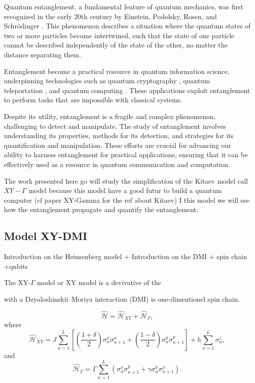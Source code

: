 Quantum entanglement, a fundamental feature of quantum mechanics, 
was first recognized in the early 20th century by Einstein, 
Podolsky, Rosen, and Schrödinger \cite{horodecki_quantum_2009}. This phenomenon describes 
a situation where the quantum states of two or more particles 
become intertwined, such that the state of one particle cannot 
be described independently of the state of the other, 
no matter the distance separating them. 



Entanglement become a practical resource 
in quantum information science, 
underpinning technologies such as quantum cryptography \cite{pirandola_advances_2020}, 
quantum teleportation \cite{bennett_teleporting_1993}, and quantum computing \cite{whitfield_quantum_2022}. 
These applications exploit entanglement 
to perform tasks that are impossible 
with classical systems.

Despite its utility, entanglement is a fragile and complex phenomenon, 
challenging to detect and manipulate. 
The study of entanglement involves understanding 
its properties, methods for its detection, and 
strategies for its quantification and manipulation. 
These efforts are crucial for advancing our ability 
to harness entanglement for practical applications, 
ensuring that it can be effectively used as a resource
in quantum communication and computation.

The work presented here go will study the simplification of the Kitaev model call $XY-\Gamma$ model 
because this model have a good futur to build a quantum computer (cf paper XY-Gamma for the ref about Kitaev) 
I this model we will see how the entanglement propagate and quantify the entanglement.

\subsection{Model XY-DMI}
Introduction on the Heinsenberg model + 
Introduction on the DMI + spin chain +qubits



The XY-$\Gamma$ model \cite{kheiri_information_2024} or XY model is a devivative of the 

with a Dzyaloshinskii–Moriya interaction (DMI) \cite{moriya_anisotropic_1960,dzyaloshinsky_thermodynamic_1958} is one-dimentionel spin chain. 


\begin{equation}
	\mathcal{\hat{H}} = \mathcal{\hat{H}}_{XY} + \mathcal{\hat{H}}_{\Gamma},
\end{equation}
where
\begin{equation}
	\mathcal{\hat{H}}_{XY} = J \sum_{n=1}^L \left[ \left( \frac{1 + \delta}{2} \right) \sigma^x_n \sigma^x_{n+1} + \left( \frac{1 - \delta}{2} \right) \sigma^y_n \sigma^y_{n+1} \right] + h \sum_{n=1}^L \sigma^z_n,
\end{equation}
and
\begin{equation}
	\mathcal{\hat{H}}_{\Gamma} = \Gamma \sum_{n=1}^L \left( \sigma^x_n \sigma^y_{n+1} + \gamma \sigma^y_n \sigma^x_{n+1} \right).
\end{equation}

